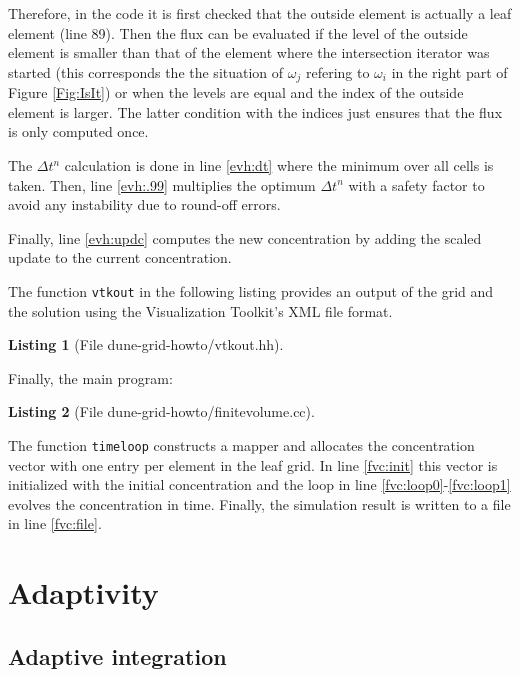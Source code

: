 \documentclass[11pt,a4paper,headinclude,footinclude,DIV16,normalheadings]{scrreprt}
\newtheorem{lst}{Listing}
\begin{document}
Therefore, in the code it is first checked that the outside element is
actually a leaf element (line 89). Then the flux can be evaluated if
the level of the outside element is smaller than that of the element
where the intersection iterator was started (this corresponds the the
situation of $\omega_j$ refering to $\omega_i$ in the right part of Figure
\ref{Fig:IsIt}) or when the levels are equal and the index of
the outside element is larger. The latter condition with the indices
just ensures that the flux is only computed once.

The $\Delta t^n$ calculation is done in line \ref{evh:dt} where the
minimum over all cells is taken. Then, line \ref{evh:.99} multiplies
the optimum $\Delta t^n$ with a safety factor to avoid any instability
due to round-off errors.

Finally, line \ref{evh:updc} computes the new concentration by adding
the scaled update to the current concentration.

The function \lstinline!vtkout! in the following listing provides an
output of the grid and the solution using the Visualization Toolkit's \cite{VTK}
XML file format.

\begin{lst}[File dune-grid-howto/vtkout.hh] \mbox{}
\nopagebreak

\end{lst}

Finally, the main program:

\begin{lst}[File dune-grid-howto/finitevolume.cc] \mbox{}
\nopagebreak

\end{lst}

The function \lstinline!timeloop! constructs a mapper and allocates the
concentration vector with one entry per element in the leaf grid. In
line \ref{fvc:init} this vector is initialized with the initial
concentration and the loop in line \ref{fvc:loop0}-\ref{fvc:loop1}
evolves the concentration in time. Finally, the simulation result is
written to a file in line \ref{fvc:file}.


\chapter{Adaptivity}

\section{Adaptive integration}
\end{document}
